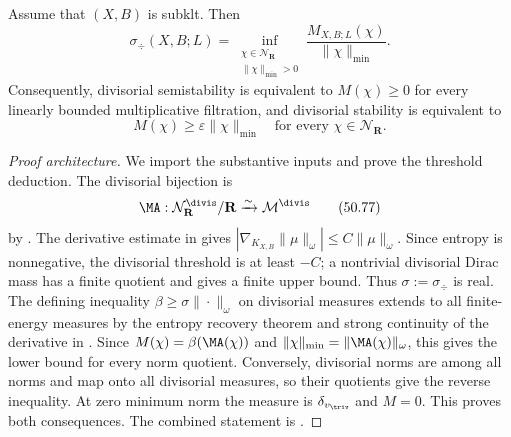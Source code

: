 \begin{theorem}\label{thm:stability-divisorial-filtrations}
Assume that $(X,B)$ is subklt.  Then
\[
 \sigma_{\div}(X,B;L)
 =\inf_{\substack{\chi\in\mathcal N_{\mathbf R}\\
                   \|\chi\|_{\min}>0}}
       \frac{M_{X,B;L}(\chi)}{\|\chi\|_{\min}}.
\tag{50.75}\label{eq:stability-filtration-threshold}
\]
Consequently, divisorial semistability is equivalent to
$M(\chi)\geq0$ for every linearly bounded multiplicative filtration, and
divisorial stability is equivalent to
\[
                M(\chi)\geq\varepsilon\|\chi\|_{\min}
                \quad\text{for every }\chi\in\mathcal N_{\mathbf R}.
\tag{50.76}\label{eq:stability-all-filtrations}
\]
\end{theorem}

\begin{proof}[Proof architecture]
We import the substantive inputs and prove the threshold deduction.
The divisorial bijection is
\[
 \MA:\mathcal N_{\mathbf R}^{\divis}/\mathbf R
       \xrightarrow{\sim}\mathcal M^{\divis}
\tag{50.77}\label{eq:stability-divnorm-divmeasure}
\]
by \cite[Theorem~C]{BJKS1}.  The derivative estimate in
\cite[Proposition~2.6]{BJKS2} gives
$|\nabla_{K_{X,B}}\|\mu\|_\omega|\le C\|\mu\|_\omega$.
Since entropy is nonnegative, the divisorial threshold is at least $-C$;
a nontrivial divisorial Dirac mass has a finite quotient and gives a
finite upper bound.  Thus $\sigma:=\sigma_{\div}$ is real.  The defining
inequality $\beta\ge\sigma\|\cdot\|_\omega$ on divisorial measures
extends to all finite-energy measures by the entropy recovery theorem
and strong continuity of the derivative in .
Since $M(\chi)=\beta(\MA(\chi))$ and
$\|\chi\|_{\min}=\|\MA(\chi)\|_\omega$, this gives the lower bound
for every norm quotient.  Conversely, divisorial norms are among all
norms and map onto all divisorial measures, so their quotients give the
reverse inequality.  At zero minimum norm the measure is
$\delta_{v_{\triv}}$ and $M=0$.  This proves both consequences.
The combined statement is \cite[Theorem~5.8]{BJKS2}.
\end{proof}

